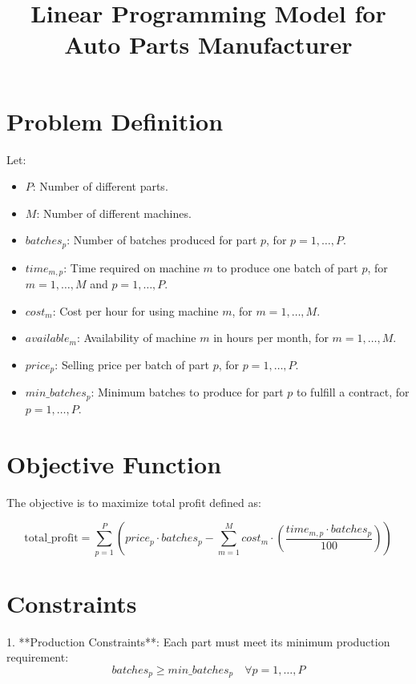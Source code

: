 \documentclass{article}
\begin{document}
\title{Linear Programming Model for Auto Parts Manufacturer}
\author{}
\date{}
\maketitle

\section*{Problem Definition}

Let:
\begin{itemize}
    \item $P$: Number of different parts.
    \item $M$: Number of different machines.
    \item $batches_p$: Number of batches produced for part $p$, for $p = 1, \ldots, P$.
    \item $time_{m,p}$: Time required on machine $m$ to produce one batch of part $p$, for $m = 1, \ldots, M$ and $p = 1, \ldots, P$.
    \item $cost_m$: Cost per hour for using machine $m$, for $m = 1, \ldots, M$.
    \item $available_m$: Availability of machine $m$ in hours per month, for $m = 1, \ldots, M$.
    \item $price_p$: Selling price per batch of part $p$, for $p = 1, \ldots, P$.
    \item $min\_batches_p$: Minimum batches to produce for part $p$ to fulfill a contract, for $p = 1, \ldots, P$.
\end{itemize}

\section*{Objective Function}

The objective is to maximize total profit defined as:

\[
\text{total\_profit} = \sum_{p=1}^{P} \left( price_p \cdot batches_p - \sum_{m=1}^{M} cost_m \cdot \left( \frac{time_{m,p} \cdot batches_p}{100} \right) \right)
\]

\section*{Constraints}

1. **Production Constraints**:
   Each part must meet its minimum production requirement:
   \[
   batches_p \geq min\_batches_p \quad \forall p = 1, \ldots, P
   \]
\end{document}
